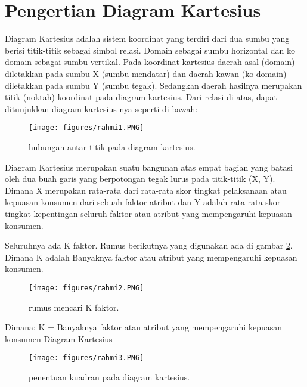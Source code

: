 
\section{Pengertian Diagram Kartesius}

Diagram Kartesius adalah sistem koordinat yang terdiri dari dua sumbu yang berisi titik-titik sebagai simbol relasi.
Domain sebagai sumbu horizontal dan ko domain sebagai sumbu vertikal.
Pada koordinat kartesius daerah asal (domain) diletakkan pada sumbu X (sumbu mendatar) dan daerah kawan (ko domain) diletakkan pada sumbu Y (sumbu tegak).
Sedangkan daerah hasilnya merupakan titik (noktah) koordinat pada diagram kartesius. Dari relasi di atas, dapat ditunjukkan diagram kartesius nya seperti di bawah:

\begin{figure}[ht]
	\centerline{\texttt{[image: figures/rahmi1.PNG]}}
	\caption{hubungan antar titik pada diagram kartesius.}
	\label{rahmi1}
	\end{figure}

Diagram Kartesius merupakan suatu bangunan atas empat bagian yang batasi oleh dua buah garis yang berpotongan tegak lurus pada titik-titik (X, Y). 
Dimana X merupakan rata-rata dari rata-rata skor tingkat pelaksanaan atau kepuasan konsumen dari sebuah faktor atribut 
dan Y adalah rata-rata skor tingkat kepentingan seluruh faktor atau atribut yang mempengaruhi kepuasan konsumen.

Seluruhnya ada K faktor. Rumus berikutnya yang digunakan ada di gambar \ref{rahmi2}. Dimana K adalah Banyaknya faktor atau atribut yang mempengaruhi kepuasan konsumen.

\begin{figure}[ht]
	\centerline{\texttt{[image: figures/rahmi2.PNG]}}
	\caption{rumus mencari K faktor.}
	\label{rahmi2}
	\end{figure}


Dimana: K = Banyaknya faktor atau atribut yang mempengaruhi kepuasan konsumen 
Diagram Kartesius	

\begin{figure}[ht]
	\centerline{\texttt{[image: figures/rahmi3.PNG]}}
	\caption{penentuan kuadran pada diagram kartesius.}
	\label{rahmi3}
\end{figure}


